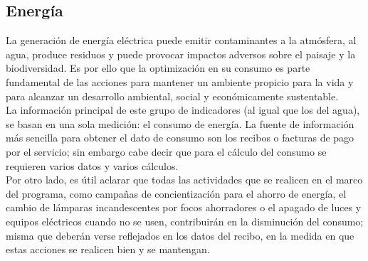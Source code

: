 
\subsection{Energía}

La generación de energía eléctrica puede emitir contaminantes a la atmósfera, al agua, produce residuos y puede provocar impactos adversos sobre el paisaje y la biodiversidad. 
Es por ello que la optimización en su consumo es parte fundamental de las acciones para mantener un ambiente propicio para la vida y para alcanzar un desarrollo  ambiental, social y económicamente sustentable.\\

La información principal de este grupo de indicadores (al igual que los del agua), se basan en una sola medición: el consumo de energía. La fuente de información más sencilla para obtener el dato de consumo son los recibos o 
facturas de pago por el servicio; sin embargo cabe decir que para el cálculo del consumo se requieren varios datos y varios cálculos.\\

Por otro lado, es útil aclarar que todas las actividades que se realicen en el marco del programa, como campañas de concientización para el ahorro de energía, el cambio de lámparas incandescentes por focos ahorradores o 
el apagado de luces y equipos eléctricos cuando no se usen, contribuirán en la disminución del consumo; misma que  deberán verse reflejados en los datos del recibo, en la medida en que estas acciones se realicen bien y se mantengan. \\

